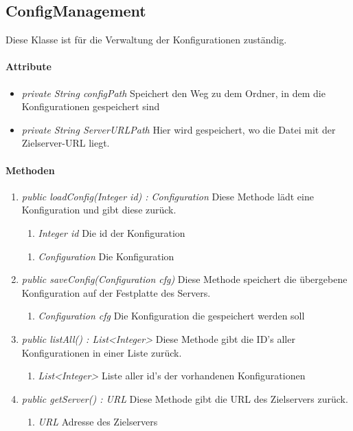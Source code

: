 
\subsection{ConfigManagement}
Diese Klasse ist für die Verwaltung der Konfigurationen zuständig.
\paragraph{Attribute}
\begin{itemize}
	\item \textit{private String configPath} Speichert den Weg zu dem Ordner, in dem die Konfigurationen gespeichert sind
	
	\item \textit{private String ServerURLPath} Hier wird gespeichert, wo die Datei mit der Zielserver-URL liegt.		
\end{itemize}

\paragraph{Methoden}
	
	\begin{enumerate}[+]
	\item \textit{public loadConfig(Integer id) : Configuration} Diese Methode lädt eine Konfiguration und gibt diese zurück.
		\begin{enumerate}[$\bullet$]
			\item \textit{Integer id} Die id der Konfiguration
		\end{enumerate}
		\vspace{-0.2cm}
		\begin{enumerate}[$\circ$]
			\item \textit{Configuration} Die Konfiguration
		\end{enumerate}
	
	\item \textit{public saveConfig(Configuration cfg)} Diese Methode speichert die übergebene Konfiguration auf der Festplatte des Servers.
	
	\begin{enumerate}[$\bullet$]
		\item \textit{Configuration cfg} Die Konfiguration die gespeichert werden soll
	\end{enumerate}
	
	\item \textit{public listAll() : List<Integer> } Diese Methode gibt die ID's aller Konfigurationen in einer Liste zurück.
	
	\begin{enumerate}[$\circ$]
		\item \textit{List<Integer>} Liste aller id's der vorhandenen Konfigurationen
	\end{enumerate}
	
	\item \textit{public getServer() : URL} Diese Methode gibt die URL des Zielservers zurück.
	
	\begin{enumerate}[$\circ$]
		\item \textit{URL} Adresse des Zielservers
	\end{enumerate}
\end{enumerate}